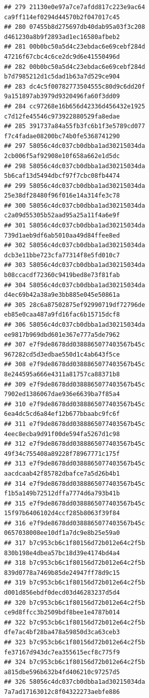 \documentclass[]{article}
\begin{document}
\begin{verbatim}
## 279 21130e0e97a7ce7afdd817c223e9ac64   ca9ff114ef0294d44570b2f047017c45
## 280 07455b8d275697db40dab95a03f3c208   d461230a8b9f2893ad1ec16580afbeb2
## 281 00b0bc50a5d4c23ebdac6e69cebf284d   47216f67cbc4c6ce2dc9d6e41550496d
## 282 00b0bc50a5d4c23ebdac6e69cebf284d   b7d7985212d1c5dad1b63a7d529ce904
## 283 dc4c5f00782773504555c80d9c6dd20f   9a151897ab3979d9320496fa60f3dd09
## 284 cc97268e16b656d42336d456432e1925   c7d12fe45546c973922880529fa8edae
## 285 391737a84a55fb3fc6b1f3e5789cd077   f7c4fadae08200bc74b0fe5368741290
## 297 58056c4dc037cb0dbba1ad30215034da   2cb006f5af92908e10f658a662e1d5dc
## 298 58056c4dc037cb0dbba1ad30215034da   5b6caf13d5494dbcf97f7cbc08fb4474
## 299 58056c4dc037cb0dbba1ad30215034da   25e38df28480f96f016e14a314fe3c78
## 300 58056c4dc037cb0dbba1ad30215034da   c2a09d55305b52aad95a25a11f4a6e9f
## 301 58056c4dc037cb0dbba1ad30215034da   739d1aeb9df6ab5010aa49d84ffee8ed
## 302 58056c4dc037cb0dbba1ad30215034da   dcb3e11bbe723cfa77314f8e5fd010c7
## 303 58056c4dc037cb0dbba1ad30215034da   b08ccacdf72360c9419bed8e73f81fab
## 304 58056c4dc037cb0dbba1ad30215034da   d4ec69b42a38a9e3bb885e045e50861a
## 305 28c6a87502875ef92990719df72796de   eb85e0caa487a9fd16fac6b15715dcf8
## 306 58056c4dc037cb0dbba1ad30215034da   ee9817b969dbd601e367e777a5de7962
## 307 e7f9de8678dd0388865077403567b45c   967282cd5d3edbae550d1c4ab643f5ce
## 308 e7f9de8678dd0388865077403567b45c   8e244595a666e4311a81757ca88371b8
## 309 e7f9de8678dd0388865077403567b45c   7902ed1386067dae936e6639ba7f85a4
## 310 e7f9de8678dd0388865077403567b45c   6ea4dc5cd6a84ef12b677bbaabc9fc6f
## 311 e7f9de8678dd0388865077403567b45c   4eec8ecba9d91f00de594fa5267d1c98
## 312 e7f9de8678dd0388865077403567b45c   49f34c755408a89228f78967771c175f
## 313 e7f9de8678dd0388865077403567b45c   aacdcaab42f85782dbafce7a5d26b4b1
## 314 e7f9de8678dd0388865077403567b45c   f1b5a149b72512dffa7774d6a793b41b
## 315 e7f9de8678dd0388865077403567b45c   15f97b6406102d4ccf285b8063f39f84
## 316 e7f9de8678dd0388865077403567b45c   0657038008ee10df1a7dc9e8b25e59a0
## 317 b7c953cb6c1f80156d72b012e64c2f5b   830b198e4dbea57bc18d39e4174bd4a4
## 318 b7c953cb6c1f80156d72b012e64c2f5b   839d0778a7469b85de24947ff78d9c15
## 319 b7c953cb6c1f80156d72b012e64c2f5b   d001d856ebdf0decd03d46283237d5d4
## 320 b7c953cb6c1f80156d72b012e64c2f5b   ce9d8ffcc3b2509bdf8bee1e4787b014
## 322 b7c953cb6c1f80156d72b012e64c2f5b   dfe7ac4bf28ba478a59850d3ca63ceb3
## 323 b7c953cb6c1f80156d72b012e64c2f5b   fe37167d943dc7ea355615ecf8c775f9
## 324 b7c953cb6c1f80156d72b012e64c2f5b   a815dbe596b632b4fd406210c97257d5
## 326 58056c4dc037cb0dbba1ad30215034da   7a7ad17163012c8f04322273aebfe886

\end{verbatim}
\end{document}
